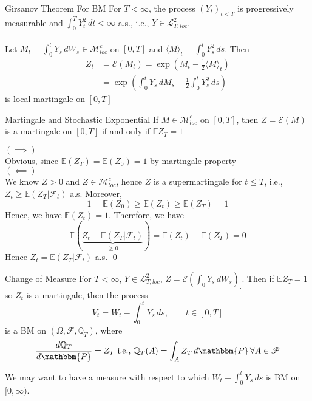 \documentclass[12pt,a4paper]{article}
\newcommand{\Q}{\mathbb{Q}}
\newcommand{\E}{\mathbb{E}}
\renewenvironment{proof}
    {\begin{trivlist}\item[\hskip\labelsep\color{blue}\bfseries Proof:]}
    {\qed\end{trivlist}}
\begin{document}
    \pagebreak
    \begin{theorem}{Girsanov Theorem For BM}{}
        For $T<\infty$, the process $(Y_t)_{t<T}$ is progressively measurable and $\int_0^T Y_t^2\, dt<\infty$ a.s., i.e., $Y\in\mathcal{L}^2_{T,loc}$.\\
        \\
        Let $M_t = \int_0^t Y_s\, dW_s \in \mathcal{M}^c_{loc}$ on $[0,T] $ and $\langle M\rangle_t = \int_0^t Y_s^2\, ds$. Then
        \begin{align*}
            Z_t &= \mathcal{E}(M_t) = \exp\left(M_t - \frac{1}{2}\langle M\rangle_t\right)\\
            &= \exp\left(\int_0^t Y_s\, dM_s- \frac{1}{2} \int_0^t Y_s^2\, ds\right)
        \end{align*}
        is local martingale on $[0,T]$
    \end{theorem}
    \begin{lemma}{Martingale and Stochastic Exponential}{}
        If $M\in\mathcal{M}^c_{loc}$ on $[0,T]$, then $Z = \mathcal{E}(M)$ is a martingale on $[0,T]$ if and only if $\E Z_T =1$
    \end{lemma}
    \begin{proof}
        $(\implies)$\\
        Obvious, since $\E(Z_T) = \E(Z_0)=1$ by martingale property\\
        $(\impliedby)$\\
        We know $Z>0$ and $Z\in\mathcal{M}^c_{loc}$, hence $Z$ is a supermartingale for $t\le T$, i.e., $Z_t\ge \E(Z_T|\mathcal{F}_t)$ a.s. Moreover,
        $$
        1 = \E(Z_0) \ge \E(Z_t) \ge \E(Z_T) = 1
        $$
        Hence, we have $\E(Z_t)=1$. Therefore, we have
        $$
        \E(\underbrace{Z_t - \E(Z_T|\mathcal{F}_t)}_{\ge 0}) = \E(Z_t) - \E(Z_T) = 0
        $$
        Hence $Z_t  = \E(Z_T|\mathcal{F}_t)$ a.s.
    \end{proof}
    \pagebreak
    \begin{theorem}{Change of Measure}{}
        For $T<\infty$, $Y\in\mathcal{L}^2_{T,loc}$, $Z = \mathcal{E}\left(\int_0^\cdot Y_s\,dW_s\right)_{\cdot}$. Then if $\E Z_T=1$ so $Z_t$ is a martingale, then the process
        $$
        V_t = W_t - \int_0^t Y_s\, ds,\qquad t\in[0,T]
        $$
        is a BM on $(\Omega,\mathscr{F},\Q_T)$, where
        $$
        \frac{d\Q_T}{d\mathbbm{P}} = Z_T\text{ i.e., } \Q_T(A) = \int_A Z_T\,d\mathbbm{P}\,\forall A\in\mathscr{F} 
        $$
    \end{theorem}
    We may want to have a measure with respect to which $W_t - \int_0^t Y_s\, ds$ is BM on $[0,\infty)$.
\end{document}
